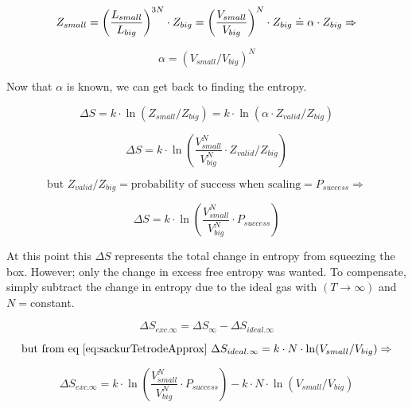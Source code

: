 \begin{equation}\label{eq:MCHS17}
\newline Z_{small}=\left(\frac{L_{small}}{L_{big}}\right)^{3N}\cdot Z_{big}=\left(\frac{V_{small}}{V_{big}}\right)^N\cdot Z_{big}\doteq\alpha\cdot Z_{big} \Rightarrow
\end{equation}

\begin{equation}\label{eq:MCHS18}
\alpha=(V_{small}/V_{big})^N
\end{equation}

Now that $\alpha$ is known, we can get back to finding the entropy.

\begin{equation}\label{eq:MCHS19}
\Delta S=k\cdot \ln(Z_{small}/Z_{big})=k\cdot \ln(\alpha\cdot Z_{valid}/Z_{big})
\end{equation}

\begin{equation}\label{eq:MCHS20}
\Delta S=k\cdot \ln(\frac{V_{small}^N}{V_{big}^N}\cdot Z_{valid}/Z_{big})
\end{equation}

\begin{equation}\label{eq:MCHS21}
\text{but }Z_{valid}/Z_{big}=\text{probability of success when scaling}=P_{success}\Rightarrow
\end{equation}

\begin{equation}\label{eq:MCHS22}
\Delta S=k\cdot \ln(\frac{V_{small}^N}{V_{big}^N}\cdot P_{success}
)
\end{equation}

At this point this $\Delta S$ represents the total change in entropy from squeezing the box. However; only the change in excess free entropy was wanted. To compensate, simply subtract the change in entropy due to the ideal gas with $(T\rightarrow\infty)$ and $N=$constant.

\begin{equation}\label{eq:MCHS23}
\Delta S_{exc.\infty}=\Delta S_{\infty}-\Delta S_{ideal.\infty}
\end{equation}

\begin{equation}\label{eq:MCHS24}
\text{but from eq~\ref{eq:sackurTetrodeApprox} }\Delta S_{ideal.\infty}=k\cdot N\cdot \ln(V_{small}/V_{big})\Rightarrow
\end{equation}

\begin{equation}\label{eq:MCHS25}
\Delta S_{exc.\infty}=k\cdot \ln(\frac{V_{small}^N}{V_{big}^N}\cdot P_{success})-k\cdot N\cdot \ln(V_{small}/V_{big})
\end{equation}

